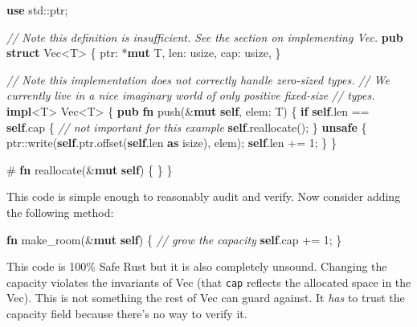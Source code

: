 \documentclass[a4paper,]{book}
\newenvironment{Shaded}{\begin{snugshade}}{\end{snugshade}}
\newcommand{\KeywordTok}[1]{\textcolor[rgb]{0.13,0.29,0.53}{\textbf{{#1}}}}
\newcommand{\DecValTok}[1]{\textcolor[rgb]{0.00,0.00,0.81}{{#1}}}
\newcommand{\CommentTok}[1]{\textcolor[rgb]{0.56,0.35,0.01}{\textit{{#1}}}}
\newcommand{\NormalTok}[1]{{#1}}
\begin{document}
\begin{Shaded}
\begin{Highlighting}[]
\KeywordTok{use} \NormalTok{std::ptr;}

\CommentTok{// Note this definition is insufficient. See the section on implementing Vec.}
\KeywordTok{pub} \KeywordTok{struct} \NormalTok{Vec<T> \{}
    \NormalTok{ptr: *}\KeywordTok{mut} \NormalTok{T,}
    \NormalTok{len: usize,}
    \NormalTok{cap: usize,}
\NormalTok{\}}

\CommentTok{// Note this implementation does not correctly handle zero-sized types.}
\CommentTok{// We currently live in a nice imaginary world of only positive fixed-size}
\CommentTok{// types.}
\KeywordTok{impl}\NormalTok{<T> Vec<T> \{}
    \KeywordTok{pub} \KeywordTok{fn} \NormalTok{push(&}\KeywordTok{mut} \KeywordTok{self}\NormalTok{, elem: T) \{}
        \KeywordTok{if} \KeywordTok{self}\NormalTok{.len == }\KeywordTok{self}\NormalTok{.cap \{}
            \CommentTok{// not important for this example}
            \KeywordTok{self}\NormalTok{.reallocate();}
        \NormalTok{\}}
        \KeywordTok{unsafe} \NormalTok{\{}
            \NormalTok{ptr::write(}\KeywordTok{self}\NormalTok{.ptr.offset(}\KeywordTok{self}\NormalTok{.len }\KeywordTok{as} \NormalTok{isize), elem);}
            \KeywordTok{self}\NormalTok{.len += }\DecValTok{1}\NormalTok{;}
        \NormalTok{\}}
    \NormalTok{\}}

    \NormalTok{# }\KeywordTok{fn} \NormalTok{reallocate(&}\KeywordTok{mut} \KeywordTok{self}\NormalTok{) \{ \}}
\NormalTok{\}}
\end{Highlighting}
\end{Shaded}

This code is simple enough to reasonably audit and verify. Now consider
adding the following method:

\begin{Shaded}
\begin{Highlighting}[]
\KeywordTok{fn} \NormalTok{make_room(&}\KeywordTok{mut} \KeywordTok{self}\NormalTok{) \{}
    \CommentTok{// grow the capacity}
    \KeywordTok{self}\NormalTok{.cap += }\DecValTok{1}\NormalTok{;}
\NormalTok{\}}
\end{Highlighting}
\end{Shaded}

This code is 100\% Safe Rust but it is also completely unsound. Changing
the capacity violates the invariants of Vec (that \texttt{cap} reflects
the allocated space in the Vec). This is not something the rest of Vec
can guard against. It \emph{has} to trust the capacity field because
there's no way to verify it.
\end{document}

